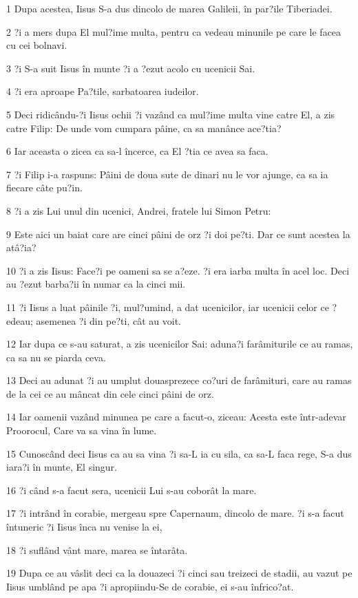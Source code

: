 \par 1 Dupa acestea, Iisus S-a dus dincolo de marea Galileii, în par?ile Tiberiadei.
\par 2 ?i a mers dupa El mul?ime multa, pentru ca vedeau minunile pe care le facea cu cei bolnavi.
\par 3 ?i S-a suit Iisus în munte ?i a ?ezut acolo cu ucenicii Sai.
\par 4 ?i era aproape Pa?tile, sarbatoarea iudeilor.
\par 5 Deci ridicându-?i Iisus ochii ?i vazând ca mul?ime multa vine catre El, a zis catre Filip: De unde vom cumpara pâine, ca sa manânce ace?tia?
\par 6 Iar aceasta o zicea ca sa-l încerce, ca El ?tia ce avea sa faca.
\par 7 ?i Filip i-a raspuns: Pâini de doua sute de dinari nu le vor ajunge, ca sa ia fiecare câte pu?in.
\par 8 ?i a zis Lui unul din ucenici, Andrei, fratele lui Simon Petru:
\par 9 Este aici un baiat care are cinci pâini de orz ?i doi pe?ti. Dar ce sunt acestea la atâ?ia?
\par 10 ?i a zis Iisus: Face?i pe oameni sa se a?eze. ?i era iarba multa în acel loc. Deci au ?ezut barba?ii în numar ca la cinci mii.
\par 11 ?i Iisus a luat pâinile ?i, mul?umind, a dat ucenicilor, iar ucenicii celor ce ?edeau; asemenea ?i din pe?ti, cât au voit.
\par 12 Iar dupa ce s-au saturat, a zis ucenicilor Sai: aduna?i farâmiturile ce au ramas, ca sa nu se piarda ceva.
\par 13 Deci au adunat ?i au umplut douasprezece co?uri de farâmituri, care au ramas de la cei ce au mâncat din cele cinci pâini de orz.
\par 14 Iar oamenii vazând minunea pe care a facut-o, ziceau: Acesta este într-adevar Proorocul, Care va sa vina în lume.
\par 15 Cunoscând deci Iisus ca au sa vina ?i sa-L ia cu sila, ca sa-L faca rege, S-a dus iara?i în munte, El singur.
\par 16 ?i când s-a facut sera, ucenicii Lui s-au coborât la mare.
\par 17 ?i intrând în corabie, mergeau spre Capernaum, dincolo de mare. ?i s-a facut întuneric ?i Iisus înca nu venise la ei,
\par 18 ?i suflând vânt mare, marea se întarâta.
\par 19 Dupa ce au vâslit deci ca la douazeci ?i cinci sau treizeci de stadii, au vazut pe Iisus umblând pe apa ?i apropiindu-Se de corabie, ei s-au înfrico?at.
